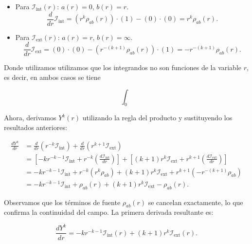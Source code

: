 \begin{itemize}
    \item Para $\mathcal{I}_{\text{int}}(r)$: $a(r)=0$, $b(r)=r$.
    \begin{equation}
        \frac{d}{dr}\mathcal{I}_{\text{int}} = (r^k \rho_{ab}(r)) \cdot (1) - (0) \cdot (0) = r^k \rho_{ab}(r).
    \end{equation}
    
    \item Para $\mathcal{I}_{\text{ext}}(r)$: $a(r)=r$, $b(r)=\infty$.
    \begin{equation}
        \frac{d}{dr}\mathcal{I}_{\text{ext}} = (0) \cdot (0) - (r^{-(k+1)} \rho_{ab}(r)) \cdot (1) = -r^{-(k+1)} \rho_{ab}(r).
    \end{equation}
\end{itemize}

Donde utilizamos utilizamos que los integrandos no son funciones de la variable \( r \), es decir, en ambos casos se tiene

\[ \int_0^{} \]

Ahora, derivamos $Y^k(r)$ utilizando la regla del producto y sustituyendo los resultados anteriores:

\begin{align*}
    \frac{dY^k}{dr} &= \frac{d}{dr}\left( r^{-k} \mathcal{I}_{\text{int}} \right) + \frac{d}{dr}\left( r^{k+1} \mathcal{I}_{\text{ext}} \right) \\
    &= \left[ -k r^{-k-1} \mathcal{I}_{\text{int}} + r^{-k} \left( \frac{d\mathcal{I}_{\text{int}}}{dr} \right) \right] + \left[ (k+1) r^k \mathcal{I}_{\text{ext}} + r^{k+1} \left( \frac{d\mathcal{I}_{\text{ext}}}{dr} \right) \right] \\
    &= -k r^{-k-1} \mathcal{I}_{\text{int}} + r^{-k} (r^k \rho_{ab}) + (k+1) r^k \mathcal{I}_{\text{ext}} + r^{k+1} (-r^{-(k+1)} \rho_{ab}) \\
    &= -k r^{-k-1} \mathcal{I}_{\text{int}} + \rho_{ab}(r) + (k+1) r^k \mathcal{I}_{\text{ext}} - \rho_{ab}(r).
\end{align*}

Observamos que los términos de fuente $\rho_{ab}(r)$ se cancelan exactamente, lo que confirma la continuidad del campo. La primera derivada resultante es:

\begin{equation}
\label{eq:Yk-prime-app}
    \frac{dY^k}{dr} = -k r^{-k-1} \mathcal{I}_{\text{int}}(r) + (k+1) r^k \mathcal{I}_{\text{ext}}(r).
\end{equation}

